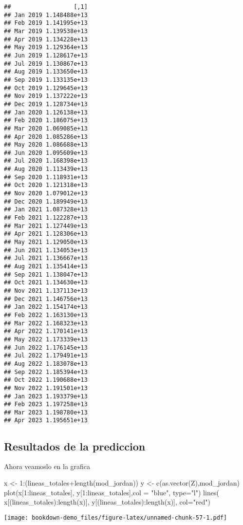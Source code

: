 \documentclass[
]{book}
\newenvironment{Shaded}{\begin{snugshade}}{\end{snugshade}}
\newcommand{\AttributeTok}[1]{\textcolor[rgb]{0.77,0.63,0.00}{#1}}
\newcommand{\DecValTok}[1]{\textcolor[rgb]{0.00,0.00,0.81}{#1}}
\newcommand{\FunctionTok}[1]{\textcolor[rgb]{0.00,0.00,0.00}{#1}}
\newcommand{\NormalTok}[1]{#1}
\newcommand{\OtherTok}[1]{\textcolor[rgb]{0.56,0.35,0.01}{#1}}
\newcommand{\SpecialCharTok}[1]{\textcolor[rgb]{0.00,0.00,0.00}{#1}}
\newcommand{\StringTok}[1]{\textcolor[rgb]{0.31,0.60,0.02}{#1}}
\begin{document}
\begin{verbatim}
##                  [,1]
## Jan 2019 1.148488e+13
## Feb 2019 1.141995e+13
## Mar 2019 1.139538e+13
## Apr 2019 1.134228e+13
## May 2019 1.129364e+13
## Jun 2019 1.128617e+13
## Jul 2019 1.130867e+13
## Aug 2019 1.133650e+13
## Sep 2019 1.133135e+13
## Oct 2019 1.129645e+13
## Nov 2019 1.137222e+13
## Dec 2019 1.128734e+13
## Jan 2020 1.126138e+13
## Feb 2020 1.186075e+13
## Mar 2020 1.069085e+13
## Apr 2020 1.085286e+13
## May 2020 1.086688e+13
## Jun 2020 1.095609e+13
## Jul 2020 1.168398e+13
## Aug 2020 1.113439e+13
## Sep 2020 1.118931e+13
## Oct 2020 1.121318e+13
## Nov 2020 1.079012e+13
## Dec 2020 1.189949e+13
## Jan 2021 1.087328e+13
## Feb 2021 1.122287e+13
## Mar 2021 1.127449e+13
## Apr 2021 1.128306e+13
## May 2021 1.129050e+13
## Jun 2021 1.134053e+13
## Jul 2021 1.136667e+13
## Aug 2021 1.135414e+13
## Sep 2021 1.138047e+13
## Oct 2021 1.134630e+13
## Nov 2021 1.137113e+13
## Dec 2021 1.146756e+13
## Jan 2022 1.154174e+13
## Feb 2022 1.163130e+13
## Mar 2022 1.168323e+13
## Apr 2022 1.170141e+13
## May 2022 1.173339e+13
## Jun 2022 1.176145e+13
## Jul 2022 1.179491e+13
## Aug 2022 1.183078e+13
## Sep 2022 1.185394e+13
## Oct 2022 1.190688e+13
## Nov 2022 1.191501e+13
## Jan 2023 1.193379e+13
## Feb 2023 1.197258e+13
## Mar 2023 1.198780e+13
## Apr 2023 1.195651e+13
\end{verbatim}

\hypertarget{resultados-de-la-prediccion}{%
\subsection{Resultados de la prediccion}\label{resultados-de-la-prediccion}}

Ahora veamoslo en la grafica

\begin{Shaded}
\begin{Highlighting}[]
\NormalTok{x }\OtherTok{\textless{}{-}} \DecValTok{1}\SpecialCharTok{:}\NormalTok{(lineas\_totales}\SpecialCharTok{+}\FunctionTok{length}\NormalTok{(mod\_jordan))}
\NormalTok{y }\OtherTok{\textless{}{-}} \FunctionTok{c}\NormalTok{(}\FunctionTok{as.vector}\NormalTok{(Z),mod\_jordan)}
\FunctionTok{plot}\NormalTok{(x[}\DecValTok{1}\SpecialCharTok{:}\NormalTok{lineas\_totales], y[}\DecValTok{1}\SpecialCharTok{:}\NormalTok{lineas\_totales],}\AttributeTok{col =} \StringTok{"blue"}\NormalTok{, }\AttributeTok{type=}\StringTok{"l"}\NormalTok{)}
\FunctionTok{lines}\NormalTok{( x[(lineas\_totales)}\SpecialCharTok{:}\FunctionTok{length}\NormalTok{(x)], y[(lineas\_totales)}\SpecialCharTok{:}\FunctionTok{length}\NormalTok{(x)], }\AttributeTok{col=}\StringTok{"red"}\NormalTok{)}
\end{Highlighting}
\end{Shaded}

\texttt{[image: bookdown-demo\_files/figure-latex/unnamed-chunk-57-1.pdf]}

  
\end{document}
